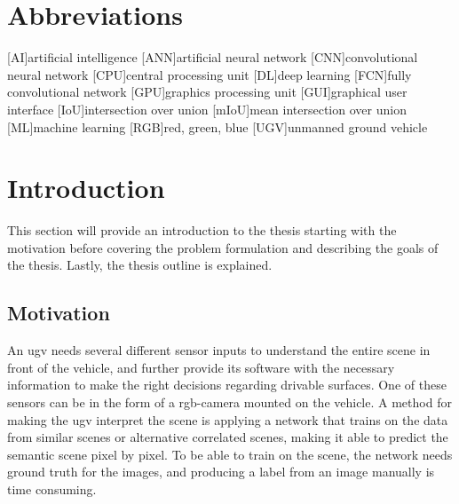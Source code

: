 \documentclass[USenglish]{ifimaster}  %
\begin{document}
\tableofcontents{}
\listoffigures{}
\listoftables{}

\chapter*{Abbreviations}
\begin{acronym}
        [AI]{artificial intelligence}
        [ANN]{artificial neural network}
        [CNN]{convolutional neural network}
        [CPU]{central processing unit}
        [DL]{deep learning}
        [FCN]{fully convolutional network}
        [GPU]{graphics processing unit}
        [GUI]{graphical user interface}
        [IoU]{intersection over union}
        [mIoU]{mean intersection over union}
        [ML]{machine learning}
        [RGB]{red, green, blue}
        [UGV]{unmanned ground vehicle}
\end{acronym}


\mainmatter{}
\chapter{Introduction}
This section will provide an introduction to the thesis starting with the motivation before covering the problem formulation and describing the goals of the thesis. Lastly, the thesis outline is explained. 
\section{Motivation}
An \ac{ugv} needs several different sensor inputs to understand the entire scene in front of the vehicle, and further provide its software with the necessary information to make the right decisions regarding drivable surfaces. One of these sensors can be in the form of a \ac{rgb}-camera mounted on the vehicle. A method for making the \ac{ugv} interpret the scene is applying a network that trains on the data from similar scenes or alternative correlated scenes, making it able to predict the semantic scene pixel by pixel. To be able to train on the scene, the network needs ground truth for the images, and producing a label from an image manually is time consuming. 
\end{document}
